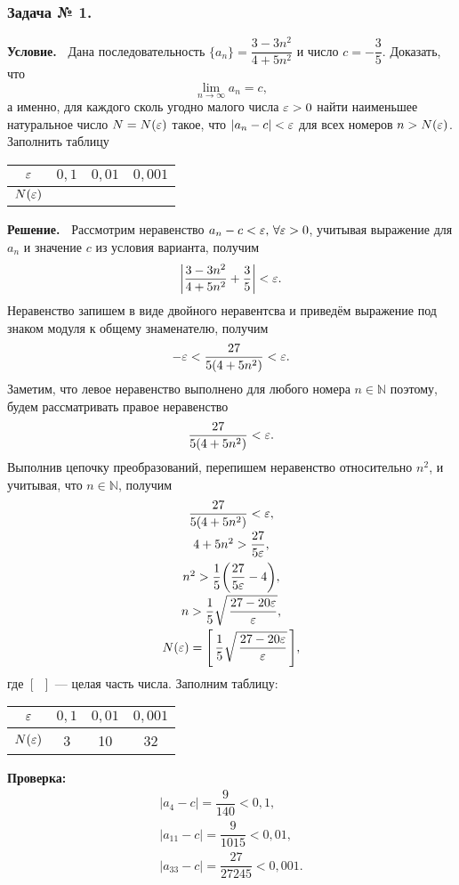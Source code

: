 \subsubsection*{\center Задача № 1.}
{\bf Условие.~}
Дана последовательность $\{a_n\} = \dfrac{3-3n^2}{4+5n^2}$ и число $c=-\dfrac{3}{5}$. Доказать, что 
$$\lim\limits_{n\rightarrow\infty}a_n=c,$$
а именно, для каждого сколь угодно малого числа $\varepsilon>0$ найти наименьшее натуральное число 
$N=N(\varepsilon)$ такое, что $|a_n-c|<\varepsilon$ для всех номеров $n>N(\varepsilon)$.
Заполнить таблицу
\begin{center}
	\begin{tabular}{|c|c|c|c|}
		\hline
		$\varepsilon$ &  $0{,}1$ & $0{,}01$ & $0{,}001$ \\
		\hline
		$N(\varepsilon)$ & & & \\
		\hline
	\end{tabular}
\end{center}
{\bf Решение.~}	
Рассмотрим неравенство $a_n-c<\varepsilon,\,\forall\varepsilon>0$, учитывая выражение для $a_n$ и значение $c$ из условия варианта,
получим
$$
\biggl|\frac{3-3n^2}{4+5n^2}+\frac35\biggr| < \varepsilon.
$$
Неравенство запишем в виде двойного неравентсва и приведём выражение под знаком модуля к общему знаменателю,
получим
$$
-\varepsilon < \frac{27}{5(4+5n^2)} < \varepsilon.
$$
Заметим, что левое неравенство выполнено для любого номера $n\in\mathbb{N}$ поэтому, будем рассматривать правое неравенство 
$$
\frac{27}{5(4+5n^2)} < \varepsilon.
$$
Выполнив цепочку преобразований, перепишем неравенство относительно $n^2$, и учитывая, что $n\in\mathbb{N}$, получим
$$
\begin{array}{c}
\dfrac{27}{5(4+5n^2)} < \varepsilon, 							\\[8pt]
4+5n^2 > \dfrac{27}{5\varepsilon}, 							\\[8pt]
n^2 > \dfrac{1}{5}\biggl(\dfrac{27}{5\varepsilon}-4\biggr), 	\\[8pt]
n > \dfrac{1}{5}\sqrt{\,\dfrac{27-20\varepsilon}{\varepsilon}}, 		\\[8pt]
N(\varepsilon) = \Biggl[\,\dfrac{1}{5}\sqrt{\,\dfrac{27-20\varepsilon}{\varepsilon}}\,\Biggr],
\end{array}
$$
где $[\phantom{a}]$ --- целая часть числа.
Заполним таблицу:
\begin{center}
	\begin{tabular}{|c|c|c|c|}
		\hline
		$\varepsilon$ &  $0{,}1$ & $0{,}01$ & $0{,}001$ \\
		\hline
		$N(\varepsilon)$ & 3 & 10 & 32 \\
		\hline
	\end{tabular}
\end{center}
\textbf{Проверка:}
$$
\begin{array}{l}
|a_4 - c| = \dfrac{9}{140} < 0{,}1,			\\[10pt]
|a_{11} - c| = \dfrac{9}{1015} < 0{,}01,	\\[10pt]
|a_{33} - c| = \dfrac{27}{27245} < 0{,}001.
\end{array}
$$

